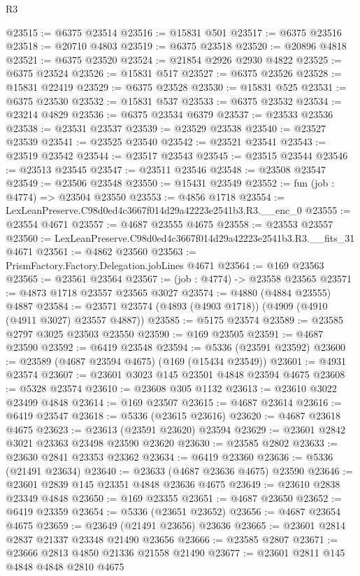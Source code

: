 \begin{lexlean}{R3}
\begin{coremodule}
@23515 := @6375 @23514
@23516 := @15831 @501
@23517 := @6375 @23516
@23518 := @20710 @4803
@23519 := @6375 @23518
@23520 := @20896 @4818
@23521 := @6375 @23520
@23524 := @21854 @2926 @2930 @4822
@23525 := @6375 @23524
@23526 := @15831 @517
@23527 := @6375 @23526
@23528 := @15831 @22419
@23529 := @6375 @23528
@23530 := @15831 @525
@23531 := @6375 @23530
@23532 := @15831 @537
@23533 := @6375 @23532
@23534 := @23214 @4829
@23536 := @6375 @23534 @6379
@23537 := @23533 @23536
@23538 := @23531 @23537
@23539 := @23529 @23538
@23540 := @23527 @23539
@23541 := @23525 @23540
@23542 := @23521 @23541
@23543 := @23519 @23542
@23544 := @23517 @23543
@23545 := @23515 @23544
@23546 := @23513 @23545
@23547 := @23511 @23546
@23548 := @23508 @23547
@23549 := @23506 @23548
@23550 := @15431 @23549
@23552 := fun (job : @4774) => @23504 @23550
@23553 := @4856 @1718
@23554 := LexLeanPreserve.C98d0ed4c3667f014d29a42223e2541b3.R3.__enc_0
@23555 := @23554 @4671
@23557 := @4687 @23555 @4675
@23558 := @23553 @23557
@23560 := LexLeanPreserve.C98d0ed4c3667f014d29a42223e2541b3.R3.__fits_31 @4671
@23561 := @4862 @23560
@23563 := PrismFactory.Factory.Delegation.jobLines @4671
@23564 := @169 @23563
@23565 := @23561 @23564
@23567 := (job : @4774) -> @23558 @23565
@23571 := @4873 @1718 @23557 @23565 @3027
@23574 := @4880 (@4884 @23555) @4887
@23584 := @23571 @23574 (@4893 (@4903 @1718)) (@4909 (@4910 (@4911 @3027) @23557 @4887))
@23585 := @5175 @23574
@23589 := @23585 @2797 @3025 @23503 @23550
@23590 := @169 @23505
@23591 := @4687 @23590
@23592 := @6419 @23548
@23594 := @5336 (@23591 @23592)
@23600 := @23589 (@4687 @23594 @4675) (@169 (@15434 @23549))
@23601 := @4931 @23574
@23607 := @23601 @3023 @145 @23501 @4848 @23594 @4675
@23608 := @5328 @23574
@23610 := @23608 @305 @1132
@23613 := @23610 @3022 @23499 @4848
@23614 := @169 @23507
@23615 := @4687 @23614
@23616 := @6419 @23547
@23618 := @5336 (@23615 @23616)
@23620 := @4687 @23618 @4675
@23623 := @23613 (@23591 @23620) @23594
@23629 := @23601 @2842 @3021 @23363 @23498 @23590 @23620
@23630 := @23585 @2802
@23633 := @23630 @2841 @23353 @23362
@23634 := @6419 @23360
@23636 := @5336 (@21491 @23634)
@23640 := @23633 (@4687 @23636 @4675) @23590
@23646 := @23601 @2839 @145 @23351 @4848 @23636 @4675
@23649 := @23610 @2838 @23349 @4848
@23650 := @169 @23355
@23651 := @4687 @23650
@23652 := @6419 @23359
@23654 := @5336 (@23651 @23652)
@23656 := @4687 @23654 @4675
@23659 := @23649 (@21491 @23656) @23636
@23665 := @23601 @2814 @2837 @21337 @23348 @21490 @23656
@23666 := @23585 @2807
@23671 := @23666 @2813 @4850 @21336 @21558 @21490
@23677 := @23601 @2811 @145 @4848 @4848 @2810 @4675

\end{coremodule}
\end{lexlean}
